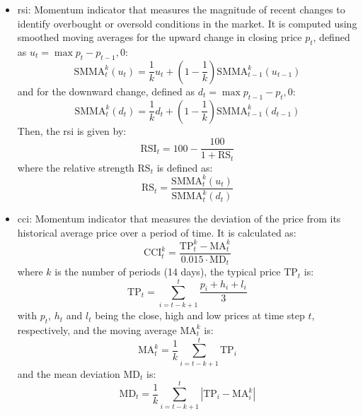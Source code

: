\begin{itemize}
    \item \acrfull{rsi}: Momentum indicator that measures the magnitude of recent changes to identify overbought or oversold conditions in the market. It is computed using smoothed moving averages for the upward change in closing price $p_t$, defined as $u_t = \max {p_t - p_{t-1}, 0}$: 
    \begin{equation}
        \text{SMMA}_t^k (u_t) = \frac{1}{k}u_t + \left(1 - \frac{1}{k}\right)\text{SMMA}_{t-1}^k (u_{t-1})
    \end{equation}
    and for the downward change, defined as $d_t = \max {p_{t-1} - p_t, 0}$:
    \begin{equation}
        \text{SMMA}_t^k (d_t) = \frac{1}{k}d_t + \left(1 - \frac{1}{k}\right)\text{SMMA}_{t-1}^k (d_{t-1})
    \end{equation}
    Then, the \acrfull{rsi} is given by:
    \begin{equation}
        \text{RSI}_t = 100 - \frac{100}{1 + \text{RS}_t}
    \end{equation}
    where the relative strength $\text{RS}_t$ is defined as:
    \begin{equation}
        \text{RS}_t = \frac{\text{SMMA}_t^k (u_t)}{\text{SMMA}_t^k (d_t)}
    \end{equation}
    \item \acrfull{cci}: Momentum indicator that measures the deviation of the price from its historical average price over a period of time. It is calculated as:
    \begin{equation}
        \text{CCI}_t^k = \frac{\text{TP}_t^k - \text{MA}_t^k}{0.015 \cdot \text{MD}_t}
    \end{equation}
    where $k$ is the number of periods (14 days), the typical price $\text{TP}_t$ is:
    \begin{equation}
        \text{TP}_t = \sum_{i=t-k+1}^{t} \frac{p_{i} + h_{i} + l_{i}}{3}
    \end{equation}
    with $p_t$, $h_t$ and $l_t$ being the close, high and low prices at time step $t$, respectively, and the moving average $\text{MA}_t^k$ is:
    \begin{equation}
        \text{MA}_t^k = \frac{1}{k} \sum_{i=t-k+1}^{t} \text{TP}_i
    \end{equation}
    and the mean deviation $\text{MD}_t$ is:
    \begin{equation}
        \text{MD}_t = \frac{1}{k} \sum_{i=t-k+1}^{t} \left| \text{TP}_i - \text{MA}_i^k \right|
    \end{equation}

\end{itemize}
